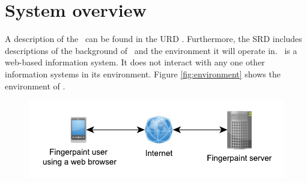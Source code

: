 \chapter{System overview}
\label{chap:systoverview}
A description of the \applicationname\ can be found in the URD \cite{urd}. Furthermore, the SRD \cite{srd} includes descriptions of the background of \projectname\ and the environment it will operate in.
\projectname\ is a web-based information system. It does not interact with any one other information systems in its environment. Figure \ref{fig:environment} shows the environment of \projectname.

\begin{figure}[h!]
\begin{center}
\includegraphics[keepaspectratio=true,width=\textwidth]{Environment.pdf}
\end{center}
\end{figure}

